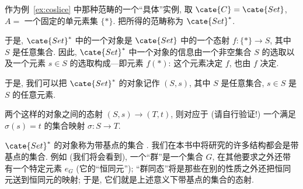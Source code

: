 \begin{example}
\label{ex:pointed-sets}
作为例~\ref{ex:coslice} 中那种范畴的一个``具体''实例, 取 $\cate{C} = \cate{Set}$, $A =$ 一个固定的单元素集 $\{*\}$. 把所得的范畴称为 $\cate{Set}^{*}%
$.

于是, $\cate{Set}^{*}$ 中的一个对象是 $\cate{Set}$ 中的一个态射 $f : \{*\} \to S$, 其中 $S$ 是任意集合. 因此, $\cate{Set}^{*}$ 中一个对象的信息由一个非空集合 $S$ 的选取以及一个元素 $s \in S$ 的选取构成---即元素 $f(*)$: 这个元素决定 $f$, 也由 $f$ 决定.

于是, 我们可以把 $\cate{Set}^{*}$ 的对象记作 $(S, s)$, 其中 $S$ 是任意集合, $s \in S$ 是 $S$ 的任意元素.

两个这样的对象之间的态射 $(S, s) \to (T, t)$, 则对应于 (请自行验证!) 一个满足 $\sigma(s) = t$ 的集合映射 $\sigma : S \to T$.

$\cate{Set}^{*}$ 的对象称为带基点的集合%
. 我们在本书中将研究的许多结构都会是带基点的集合. 例如 (我们将会看到), 一个``群''是一个集合 $G$, 在其他要求之外还带有一个特定元素 $e_G$ (它的``恒同元''); ``群同态''将是那些在别的性质之外还把恒同元送到恒同元的映射; 于是, 它们就是上述意义下带基点的集合的态射.
\end{example}

